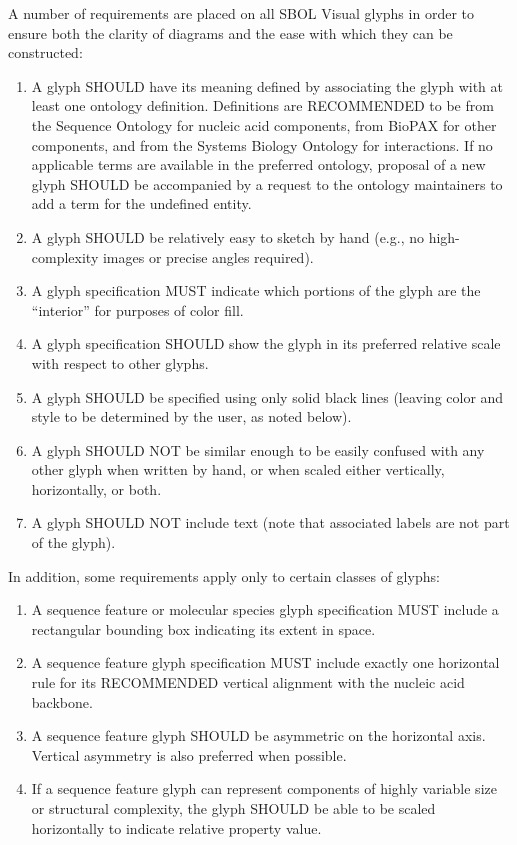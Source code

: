 A number of requirements are placed on all SBOL Visual glyphs in order to
ensure both the clarity of diagrams and the ease with which they can
be constructed:
\begin{enumerate}
\item A glyph SHOULD have its meaning defined by associating the glyph with at least one ontology definition.
	Definitions are RECOMMENDED to be from the Sequence Ontology for nucleic acid components, from BioPAX for other components, and from the Systems Biology Ontology for interactions.  
	If no applicable terms are available in the preferred ontology, proposal of a new glyph SHOULD be accompanied by a request to the ontology maintainers to add a term for the undefined entity.  
\item A glyph SHOULD be relatively easy to sketch by hand (e.g., no high-complexity images or precise angles required).
\item A glyph specification MUST indicate which portions of the glyph are the ``interior'' for purposes of color fill.
\item A glyph specification SHOULD show the glyph in its preferred relative scale with respect to other glyphs.
\item A glyph SHOULD be specified using only solid black lines (leaving color and style to be determined by the user, as noted below).
\item A glyph SHOULD NOT be similar enough to be easily confused with any other glyph when written by hand, or when scaled either vertically, horizontally, or both.
\item A glyph SHOULD NOT include text (note that associated labels are not part of the glyph).
\end{enumerate}

In addition, some requirements apply only to certain classes of glyphs:
\begin{enumerate}[resume]
\item A sequence feature or molecular species glyph specification MUST include a rectangular bounding box indicating its extent in space.
\item A sequence feature glyph specification MUST include exactly one horizontal rule for its RECOMMENDED vertical alignment with the nucleic acid backbone.
\item A sequence feature glyph SHOULD be asymmetric on the horizontal axis. Vertical asymmetry is also preferred when possible.
\item If a sequence feature glyph can represent components of highly variable size or structural complexity, the glyph SHOULD be able to be scaled horizontally to indicate relative property value.
\end{enumerate}

